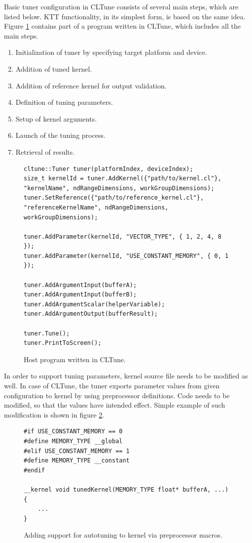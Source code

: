 \documentclass
[
    digital, %
    oneside, %
    table, %
    nolof, %
    nolot, %
    nocover %
]{fithesis3}
\begin{document}
Basic tuner configuration in CLTune consists of several main steps, which are listed below. KTT functionality, in its simplest form, is based on the
same idea. Figure \ref{cltune-example} contains part of a program written in CLTune, which includes all the main steps.
\begin{enumerate}
    \item Initialization of tuner by specifying target platform and device.
    \item Addition of tuned kernel.
    \item Addition of reference kernel for output validation.
    \item Definition of tuning parameters.
    \item Setup of kernel arguments.
    \item Launch of the tuning process.
    \item Retrieval of results.
\end{enumerate}
\begin{figure}
\begin{lstlisting}
cltune::Tuner tuner(platformIndex, deviceIndex);
size_t kernelId = tuner.AddKernel({"path/to/kernel.cl"}, "kernelName", ndRangeDimensions, workGroupDimensions);
tuner.SetReference({"path/to/reference_kernel.cl"}, "referenceKernelName", ndRangeDimensions, workGroupDimensions);

tuner.AddParameter(kernelId, "VECTOR_TYPE", { 1, 2, 4, 8 });
tuner.AddParameter(kernelId, "USE_CONSTANT_MEMORY", { 0, 1 });

tuner.AddArgumentInput(bufferA);
tuner.AddArgumentInput(bufferB);
tuner.AddArgumentScalar(helperVariable);
tuner.AddArgumentOutput(bufferResult);

tuner.Tune();
tuner.PrintToScreen();
\end{lstlisting}
\caption{Host program written in CLTune.}
\label{cltune-example}
\end{figure}

In order to support tuning parameters, kernel source file needs to be modified as well. In case of CLTune, the tuner exports parameter values from
given configuration to kernel by using preprocessor definitions. Code needs to be modified, so that the values have intended effect. Simple example
of such modification is shown in figure \ref{cltune-example-kernel}.
\begin{figure}
\begin{lstlisting}
#if USE_CONSTANT_MEMORY == 0
#define MEMORY_TYPE __global
#elif USE_CONSTANT_MEMORY == 1
#define MEMORY_TYPE __constant
#endif

__kernel void tunedKernel(MEMORY_TYPE float* bufferA, ...)
{
    ...
}
\end{lstlisting}
\caption{Adding support for autotuning to kernel via preprocessor macros.}
\label{cltune-example-kernel}
\end{figure}
\end{document}
